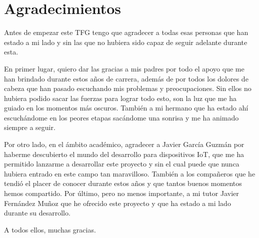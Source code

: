 \newpage %
\thispagestyle{empty}
\mbox{}

\chapter*{Agradecimientos}
\setcounter{page}{7}
Antes de empezar este TFG tengo que agradecer a todas esas personas que han estado a mi lado y sin las que no hubiera sido capaz de seguir adelante durante esta.

En primer lugar, quiero dar las gracias a mis padres por todo el apoyo que me han brindado durante estos años de carrera, además de por todos los dolores de cabeza que han pasado escuchando mis problemas y preocupaciones. Sin ellos no hubiera podido sacar las fuerzas para lograr todo esto, son la luz que me ha guiado en los momentos más oscuros. También a mi hermano que ha estado ahí escuchándome en los peores etapas sacándome una sonrisa y me ha animado siempre a seguir.

Por otro lado, en el ámbito académico, agradecer a Javier García Guzmán por haberme descubierto el mundo del desarrollo para dispositivos IoT, que me ha permitido lanzarme a desarrollar este proyecto y sin el cual puede que nunca hubiera entrado en este campo tan maravilloso. También a los compañeros que he tendió el placer de conocer durante estos años y que tantos buenos momentos hemos compartido. Por último, pero no menos importante, a mi tutor Javier Fernández Muñoz que he ofrecido este proyecto y que ha estado a mi lado durante su desarrollo.

A todos ellos, muchas gracias.